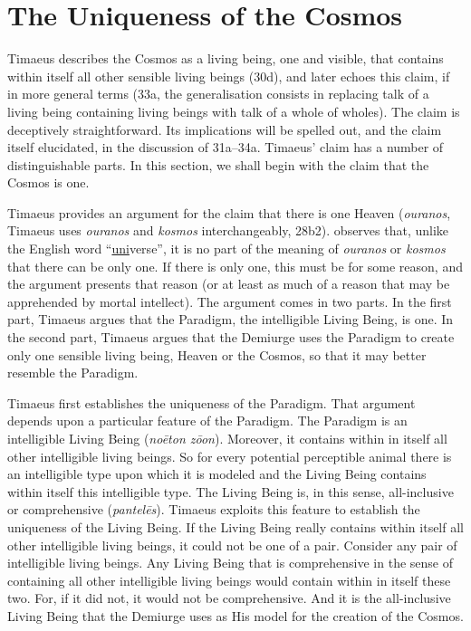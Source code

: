 
\section{The Uniqueness of the Cosmos} %
\label{sec:the_uniqueness_of_the_Cosmos}

Timaeus describes the Cosmos as a living being, one and visible, that contains within itself all other sensible living beings (30d), and later echoes this claim, if in more general terms (33a, the generalisation consists in replacing talk of a living being containing living beings with talk of a whole of wholes). The claim is deceptively straightforward. Its implications will be spelled out, and the claim itself elucidated, in the discussion of 31a--34a. Timaeus' claim has a number of distinguishable parts. In this section, we shall begin with the claim that the Cosmos is one.

Timaeus provides an argument for the claim that there is one Heaven (\emph{ouranos}, Timaeus uses \emph{ouranos} and \emph{kosmos} interchangeably, 28b2). \citet[84]{Taylor:1928qb} observes that, unlike the English word ``\underline{uni}verse'', it is no part of the meaning of \emph{ouranos} or \emph{kosmos} that there can be only one. If there is only one, this must be for some reason, and the argument presents that reason (or at least as much of a reason that may be apprehended by mortal intellect). The argument comes in two parts. In the first part, Timaeus argues that the Paradigm, the intelligible Living Being, is one. In the second part, Timaeus argues that the Demiurge uses the Paradigm to create only one sensible living being, Heaven or the Cosmos, so that it may better resemble the Paradigm.

Timaeus first establishes the uniqueness of the Paradigm. That argument depends upon a particular feature of the Paradigm. The Paradigm is an intelligible Living Being (\emph{noēton zōon}). Moreover, it contains within in itself all other intelligible living beings. So for every potential perceptible animal there is an intelligible type upon which it is modeled and the Living Being contains within itself this intelligible type. The Living Being is, in this sense, all-inclusive or comprehensive (\emph{pantelēs}). Timaeus exploits this feature to establish the uniqueness of the Living Being. If the Living Being really contains within itself all other intelligible living beings, it could not be one of a pair. Consider any pair of intelligible living beings. Any Living Being that is comprehensive in the sense of containing all other intelligible living beings would contain within in itself these two. For, if it did not, it would not be comprehensive. And it is the all-inclusive Living Being that the Demiurge uses as His model for the creation of the Cosmos.

